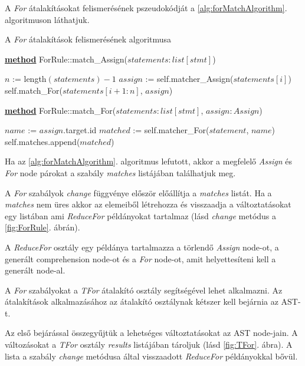 A \emph{For} átalakításokat felismerésének pszeudokódját a
\ref{alg:forMatchAlgorithm}. algoritmuson láthatjuk.

\begin{algorithm}[H]
	\caption{A \emph{For} átalakítások felismerésének algoritmusa}
	\label{alg:forMatchAlgorithm}
	\textbf{\underline{method}} ForRule::match\_Assign($statements: list[stmt]$)
	
	\begin{algorithmic}[1]
	\State $n$ := length$(statements) - 1$
		\State $assign$ := self.matcher\_Assign($statements[i]$)
			\State self.match\_For($statements[i+1:n]$, $assign$)
		\EndIf
	\EndFor
	\end{algorithmic}

	\textbf{\underline{method}} ForRule::match\_For($statements: list[stmt]$, $assign: Assign$)
	\begin{algorithmic}[1]	
	\State $name$ := $assign$.target.id
		\State $matched$ := self.matcher\_For($statement$, $name$)
			\State self.matches.append($matched$)
			\State \Return
		\EndIf
			\State \Return
		\EndIf
	\EndFor
	\end{algorithmic}
\end{algorithm}

Ha az \ref{alg:forMatchAlgorithm}. algoritmus lefutott,
akkor a megfelelő \emph{Assign} és \emph{For} node
párokat a szabály \emph{matches} listájában találhatjuk meg.

A \emph{For} szabályok \emph{change} függvénye először előállítja a \emph{matches} listát.
Ha a \emph{matches} nem üres akkor az elemeiből létrehozza és visszaadja
a változtatásokat egy listában ami \emph{ReduceFor} példányokat tartalmaz
(lásd \emph{change} metódus a \ref{fig:ForRule}. ábrán).

A \emph{ReduceFor} osztály egy példánya tartalmazza
a törlendő \emph{Assign} node-ot,
a generált comprehension node-ot
és a \emph{For} node-ot, amit helyettesíteni kell a generált node-al.

A \emph{For} szabályokat a \emph{TFor} átalakító osztály segítségével lehet alkalmazni.
Az átalakítások alkalmazásához az átalakító osztálynak kétszer kell bejárnia az AST-t.

Az első bejárással összegyűjtük a lehetséges változtatásokat az AST node-jain.
A változásokat a \emph{TFor} osztály \emph{results} listájában tároljuk
(lásd \ref{fig:TFor}. ábra).
A lista a szabály \emph{change} metódusa által visszaadott
\emph{ReduceFor} példányokkal bővül.

